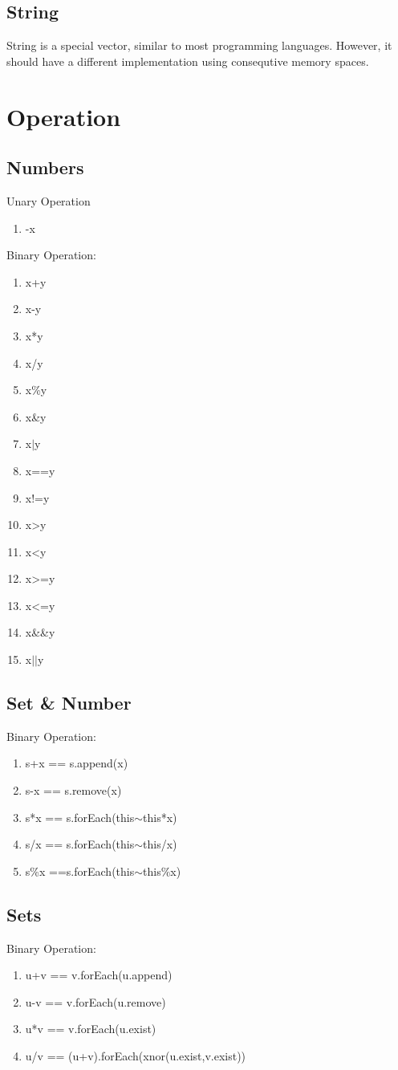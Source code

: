 \documentclass[12pt, a4paper]{IEEEtran}
\begin{document}
\subsection{String}
	String is a special vector, similar to most programming languages. However, it should have a different implementation using consequtive memory spaces.
	
\section{Operation}
\subsection{Numbers}
	Unary Operation
	\begin{enumerate}
		\item -x
	\end{enumerate}
	Binary Operation: 
	\begin{enumerate}
		\item x+y
		\item x-y
		\item x*y
		\item x/y
		\item x\%y
		\item x\&y
		\item x$|$y
		\item x==y
		\item x!=y
		\item x>y
		\item x<y
		\item x>=y
		\item x<=y
		\item x\&\&y
		\item x$||$y
	\end{enumerate}
\subsection{Set \& Number}
	Binary Operation:
	\begin{enumerate}
		\item s+x == s.append(x)
		\item s-x == s.remove(x)
		\item s*x == s.forEach({this$\sim$this*x})
		\item s/x == s.forEach({this$\sim$this/x})
		\item s\%x ==s.forEach({this$\sim$this\%x})
	\end{enumerate}
\subsection{Sets}
	Binary Operation:
	\begin{enumerate}
		\item u+v == v.forEach(u.append)
		\item u-v == v.forEach(u.remove)
		\item u*v == v.forEach(u.exist)
		\item u/v == (u+v).forEach(xnor(u.exist,v.exist))
	\end{enumerate}
\end{document}
